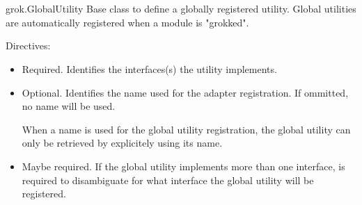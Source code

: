 \section{}

\section{}

\section{}

\section{}

  \begin{classdesc*}{grok.GlobalUtility}
    Base class to define a globally registered utility. Global utilities are
    automatically registered when a module is "grokked".

  \begin{bf}Directives:\end{bf}

  \begin{itemize}
    \item[\function{grok.implements(*interfaces)}] Required. Identifies the
    interfaces(s) the utility implements.

    \item[\function{grok.name(name)}] Optional. Identifies the name used for
    the adapter registration. If ommitted, no name will be used.

    When a name is used for the global utility registration, the global utility
    can only be retrieved by explicitely using its name.

    \item[\function{grok.provides(name)}] Maybe required. If the global utility
    implements more than one interface,  is required to
    disambiguate for what interface the global utility will be registered.
  \end{itemize}
  \end{classdesc*}

\section{}

